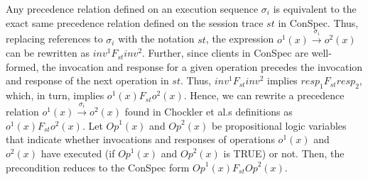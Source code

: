 \documentclass[journal,compsoc]{IEEEtran}
\begin{document}
   Any precedence relation defined on an execution sequence $\sigma_i$  is
   equivalent to the exact same precedence relation defined on the session trace $\mathit{st}$ in ConSpec.
    Thus, replacing references to $\sigma_i$  with the notation  $\mathit{st}$, the expression $ \mathit{o}^1(x) \xrightarrow{\sigma_i} \mathit{o}^2(x) $ can be rewritten as  $\mathit{inv}^1 F_\mathit{st} \mathit{inv}^2$. %
     Further, since clients in ConSpec are well-formed, the invocation and response for a given operation precedes the invocation and response of the next operation in $\mathit{st}$.  %
  Thus,  $\mathit{inv}^1 F_\mathit{st} \mathit{inv}^2$ implies $ \mathit{resp}_1 F_\mathit{st}  \mathit{resp}_2 $, which, in turn, implies $\mathit{o}^1(x) F_\mathit{st} \mathit{o}^2(x)$. 
 Hence, we can rewrite a precedence relation $ \mathit{o}^1(x) \xrightarrow{\sigma_i} \mathit{o}^2(x) $ found in Chockler et al.\textquotesingle s definitions as $\mathit{o}^1(x) F_\mathit{st} \mathit{o}^2(x)$. %
 Let $\mathit{Op}^1(x)$ and $\mathit{Op}^2(x)$  be propositional logic
  variables that indicate whether invocations and responses of operations $\mathit{o}^1(x)$ and $\mathit{o}^2(x)$  have
  executed (if $\mathit{Op}^1(x)$ and $\mathit{Op}^2(x)$ is TRUE) or not.  Then, the precondition reduces to 
    the ConSpec form $\mathit{Op}^1(x) F_\mathit{st} \mathit{Op}^2(x) $.  
\end{document}

